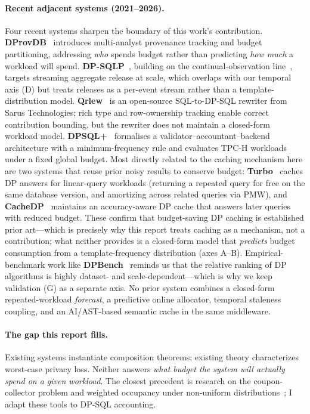 \documentclass[sigconf,nonacm]{acmart}
\begin{document}
\paragraph{Recent adjacent systems (2021--2026).}
Four recent systems sharpen the boundary of this work's contribution. \textbf{DProvDB}~\cite{zhang2024dprovdb} introduces multi-analyst provenance tracking and budget partitioning, addressing \emph{who} spends budget rather than predicting \emph{how much} a workload will spend. \textbf{DP-SQLP}~\cite{dpsqlp2024}, building on the continual-observation line~\cite{dwork2010continual}, targets streaming aggregate release at scale, which overlaps with our temporal axis (D) but treats releases as a per-event stream rather than a template-distribution model. \textbf{Qrlew}~\cite{sarus2024qrlew} is an open-source SQL-to-DP-SQL rewriter from Sarus Technologies; rich type and row-ownership tracking enable correct contribution bounding, but the rewriter does not maintain a closed-form workload model. \textbf{DPSQL+}~\cite{dpsqlplus2026} formalises a validator--accountant--backend architecture with a minimum-frequency rule and evaluates TPC-H workloads under a fixed global budget. Most directly related to the caching mechanism here are two systems that reuse prior noisy results to conserve budget: \textbf{Turbo}~\cite{kostopoulou2023turbo} caches DP answers for linear-query workloads (returning a repeated query for free on the same database version, and amortizing across related queries via PMW), and \textbf{CacheDP}~\cite{mazmudar2023cachedp} maintains an accuracy-aware DP cache that answers later queries with reduced budget. These confirm that budget-saving DP caching is established prior art---which is precisely why this report treats caching as a mechanism, not a contribution; what neither provides is a closed-form model that \emph{predicts} budget consumption from a template-frequency distribution (axes A--B). Empirical-benchmark work like \textbf{DPBench}~\cite{hay2016dpbench} reminds us that the relative ranking of DP algorithms is highly dataset- and scale-dependent---which is why we keep validation (G) as a separate axis. No prior system combines a closed-form repeated-workload \emph{forecast}, a predictive online allocator, temporal staleness coupling, and an AI/AST-based semantic cache in the same middleware.

\paragraph{The gap this report fills.}
Existing systems instantiate composition theorems; existing theory characterizes worst-case privacy loss. Neither answers \emph{what budget the system will actually spend on a given workload}. The closest precedent is research on the coupon-collector problem and weighted occupancy under non-uniform distributions~\cite{flajolet1992birthday}; I adapt these tools to DP-SQL accounting.
\end{document}
